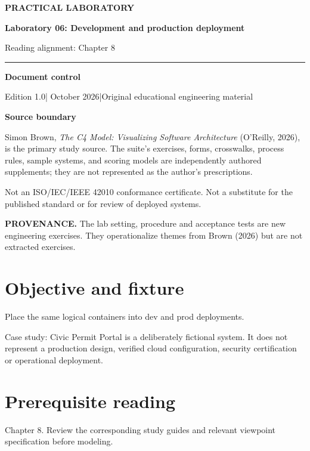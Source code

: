 \documentclass[10pt,letterpaper]{article}
\newcommand{\SourceNote}[1]{\par\smallskip\noindent\colorbox{C4Light}{\parbox{0.94\linewidth}{\footnotesize\textbf{PROVENANCE.} #1}}\par\medskip}
\newcommand{\DocStart}[3]{%
\begin{document}
\begin{titlepage}
\renewcommand{\thepage}{title-\arabic{page}}
\vspace*{0.55in}
{\sffamily\bfseries\small\color{C4Teal}#1}\par\vspace{0.24in}
{\sffamily\bfseries\fontsize{26}{31}\selectfont\color{C4Navy}#2}\par\vspace{0.18in}
{\large\color{C4Gray}#3}\par\vspace{0.4in}
\textcolor{C4Teal}{\rule{\linewidth}{1.15pt}}\par\vspace{0.24in}
\textbf{Document control}\par
Edition 1.0\quad|\quad 30 October 2026\quad|\quad Original educational engineering material\par
\vspace{0.17in}
\textbf{Source boundary}\par
Simon Brown, \emph{The C4 Model: Visualizing Software Architecture} (O'Reilly, 2026), is the primary study source. The suite's exercises, forms, crosswalks, process rules, sample systems, and scoring models are independently authored supplements; they are not represented as the author's prescriptions.\par
\vfill
{\small\color{C4Gray}Not an ISO/IEC/IEEE 42010 conformance certificate. Not a substitute for the published standard or for review of deployed systems.}\par
\end{titlepage}
}
\DocStart{PRACTICAL LABORATORY}{Laboratory 06: Development and production deployment}{Reading alignment: Chapter 8}
\SourceNote{The lab setting, procedure and acceptance tests are new engineering exercises. They operationalize themes from Brown (2026) but are not extracted exercises.}
\section{Objective and fixture}
Place the same logical containers into dev and prod deployments.

Case study: Civic Permit Portal is a deliberately fictional system. It does not represent a production design, verified cloud configuration, security certification or operational deployment.


\section{Prerequisite reading}
Chapter 8. Review the corresponding study guides and relevant viewpoint specification before modeling.
\end{document}
